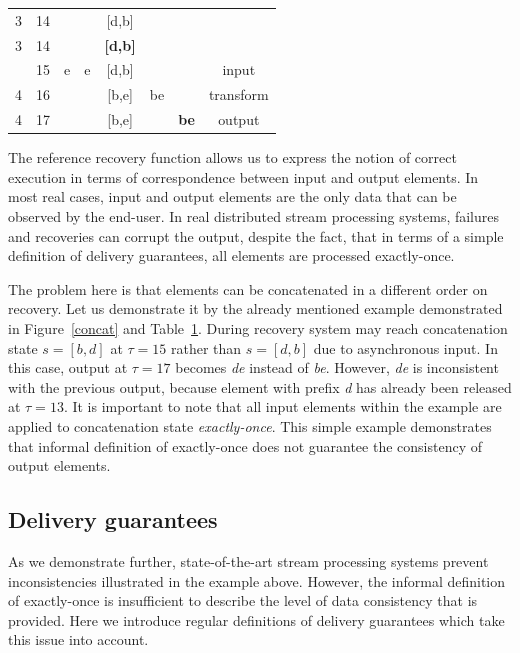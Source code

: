 \begin{table}[!b]
\begin {center}
\begin{tabular}{c|l|c|c|c|c|c|c}
3   &   14   &       &               &   [d,b]         &       &           &    \\
3   &   14   &       &               &   {\bf [d,b]}   &       &           &    \\
\arrayrulecolor{red}\hline
4   &   15   &  e    &   e           &   [d,b]   &      &           &   input \\
4   &   16   &       &              &   [b,e]   &   be    &          &   transform \\
4   &   17   &       &              &   [b,e]   &       &   {\bf be}       &   output \\
\end{tabular}
\label{concat_example}
\end {center}
\end{table}

The reference recovery function allows us to express the notion of correct execution in terms of correspondence between input and output elements. In most real cases, input and output elements are the only data that can be observed by the end-user. In real distributed stream processing systems, failures and recoveries can corrupt the output, despite the fact, that in terms of a simple definition of delivery guarantees, all elements are processed exactly-once. 

The problem here is that elements can be concatenated in a different order on recovery. Let us demonstrate it by the already mentioned example demonstrated in Figure~\ref{concat} and Table~\ref{concat_example}. During recovery system may reach concatenation state $s=[b,d]$ at $\tau=15$ rather than $s=[d,b]$ due to asynchronous input. In this case, output at $\tau=17$ becomes {\em de} instead of {\em be}. However, {\em de} is inconsistent with the previous output, because element with prefix {\em d} has already been released at $\tau=13$. It is important to note that all input elements within the example are applied to concatenation state {\em  exactly-once}. This simple example demonstrates that informal definition of exactly-once does not guarantee the consistency of output elements.

\subsection{Delivery guarantees}

As we demonstrate further, state-of-the-art stream processing systems prevent inconsistencies illustrated in the example above. However, the informal definition of exactly-once is insufficient to describe the level of data consistency that is provided. Here we introduce regular definitions of delivery guarantees which take this issue into account. 

